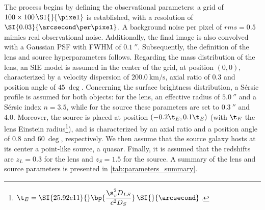 The process begins by defining the observational parameters: a grid of $100 \times 100 \,\SI{}{\pixel}$ is established, with a resolution of $\SI{0.03}{\arcsecond\per\pixel}$. A background noise per pixel of $rms = 0.5$ mimics real observational noise. Additionally, the final image is also convolved with a Gaussian PSF with FWHM of $\SI{0.1}{\arcsecond}$. Subsequently, the definition of the lens and source hyperparameters follows. Regarding the mass distribution of the lens, an SIE model is assumed in the center of the grid, at position $(0,0)$, characterized by a velocity dispersion of $\SI{200.0}{\kilo\meter\per\second}$, axial ratio of $0.3$ and position angle of $\SI{45}{\deg}$. Concerning the surface brightness distribution, a Sérsic profile is assumed for both objects: for the lens, an effective radius of $\SI{5.0}{\arcsecond}$ and a Sérsic index $n = 3.5$, while for the source these parameters are set to $\SI{0.3}{\arcsecond}$ and $4.0$. Moreover, the source is placed at position $(-0.2 \t_E, 0.1\t_E)$ (with $\t_E$ the lens Einstein radius\footnote{$\t_E = \SI{25.92e11}{} \bp{\dfrac{\s_v^2 D_{LS}}{c^2 D_S}} \, \SI{}{\arcsecond}\,$.}), and is characterized by an axial ratio and a position angle of $0.8$ and $\SI{60}{\deg}$, respectively. We then assume that the source galaxy hosts at its center a point-like source, \eg a quasar. Finally, it is assumed that the redshifts are $z_L = 0.3$ for the lens and $z_S = 1.5$ for the source. A summary of the lens and source parameters is presented in \cref{tab:parameters_summary}.

